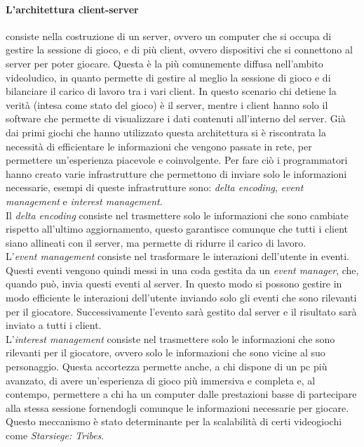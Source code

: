         \paragraph{L'architettura client-server} consiste nella costruzione di un server, ovvero un computer che si occupa di gestire la sessione di gioco, e di più client, ovvero
            dispositivi che si connettono al server per poter giocare. Questa è la più comunemente diffusa nell'ambito videoludico, in quanto permette di gestire al meglio la
            sessione di gioco e di bilanciare il carico di lavoro tra i vari client. In questo scenario chi detiene la verità (intesa come stato del gioco) è il server, mentre
            i client hanno solo il software che permette di visualizzare i dati contenuti all'interno del server. Già dai primi giochi che hanno utilizzato questa architettura
            si è riscontrata la necessità di efficientare le informazioni che vengono passate in rete, per permettere un'esperienza piacevole e coinvolgente. Per fare ciò i 
            programmatori hanno creato varie infrastrutture che permettono di inviare solo le informazioni necessarie, esempi di queste infrastrutture sono: \textit{delta encoding},
            \textit{event management} e \textit{interest management}.\\
            Il \textit{delta encoding} consiste nel trasmettere solo le informazioni che sono cambiate rispetto all'ultimo aggiornamento, questo garantisce comunque che tutti
            i client siano allineati con il server, ma permette di ridurre il carico di lavoro.\\
            L'\textit{event management} consiste nel trasformare le interazioni dell'utente in eventi. Questi eventi vengono quindi messi in una coda gestita da un 
            \textit{event manager}, che, quando può, invia questi eventi al server. In questo modo si possono gestire in modo efficiente le interazioni dell'utente inviando
            solo gli eventi che sono rilevanti per il giocatore. Successivamente l'evento sarà gestito dal server e il risultato sarà inviato a tutti i client.\\
            L'\textit{interest management} consiste nel trasmettere solo le informazioni che sono rilevanti per il giocatore, ovvero solo le informazioni che sono vicine al suo 
            personaggio. Questa accortezza permette anche, a chi dispone di un pc più avanzato, di avere un'esperienza di gioco più immersiva e completa e, al contempo, permettere 
            a chi ha un computer dalle prestazioni basse di partecipare alla stessa sessione fornendogli comunque le informazioni necessarie per giocare. Questo meccanismo è stato
            determinante per la scalabilità di certi videogiochi come \textit{Starsiege: Tribes}.\\

